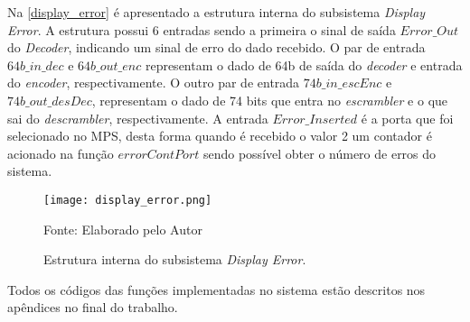 Na \autoref{display_error} é apresentado a estrutura interna do subsistema \textit{Display Error}. A estrutura possui 6 entradas sendo a primeira o sinal de saída $Error\_Out$ do \textit{Decoder}, indicando um sinal de erro do dado recebido. O par de entrada $64b\_in\_dec$ e $64b\_out\_enc$ representam o dado de 64b de saída do \textit{decoder} e entrada do \textit{encoder}, respectivamente. O outro par de entrada $74b\_in\_escEnc$ e $74b\_out\_desDec$, representam o dado de 74 bits que entra no \textit{escrambler} e o que sai do \textit{descrambler}, respectivamente. A entrada $Error\_Inserted$ é a porta que foi selecionado no MPS, desta forma quando é recebido o valor 2 um contador é acionado na função $errorContPort$ sendo possível obter o número de erros do sistema.

\begin{figure}[H]
	\caption{\label{display_error}  Estrutura interna do subsistema \textit{Display Error}.}
	\centering
	\texttt{[image: display\_error.png]}
	\begin{center}
		Fonte: Elaborado pelo Autor
	\end{center}	
\end{figure}


Todos os códigos das funções implementadas no sistema estão descritos nos apêndices no final do trabalho.


